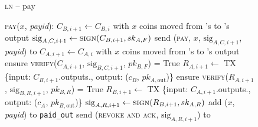 \begin{figure}[H]
  \begin{processbox}{\textsc{ln} -- pay}
    \begin{algorithmic}[1]
      \State \textsc{pay}($x$, \textit{payid}): 
      \Indent
        \State $C_{B, i+1} \gets C_{B, i}$ with $x$ coins moved from \alice's to
        \bob's output
        \State $\mathrm{sig}_{A, C, i+1} \gets \textsc{sign}(C_{B, i+1}, sk_{A,
        F})$ 
        \State send (\textsc{pay}, $x$, $\mathrm{sig}_{A, C, i+1}$,
        \textit{payid}) to \bob
        \State {}
        \State {}
        \State {}
        \State {} 
        \State {}
        \State {}
        \State {}
        \State $C_{A, i+1} \gets C_{A, i}$ with $x$ coins moved from \alice's to
        \bob's output
        \State ensure \textsc{verify}($C_{A, i+1}$, $\mathrm{sig}_{B, C, i+1}$,
        $pk_{B, F}$) = True
        \State $R_{A, i+1} \gets$ TX \{input: $C_{B, i+1}$.outputs.\alice,
        output: ($c_B$, $pk_{A, \mathrm{out}}$)\}
        \State ensure \textsc{verify}($R_{A, i+1}$, $\mathrm{sig}_{B, R, i+1}$,
        $pk_{B, R}$) = True
        \State $R_{B, i+1} \gets$ TX \{input: $C_{A, i+1}$.outputs.\bob,
        output: ($c_A$, $pk_{B, \mathrm{out}}$)\}
        \State $\mathrm{sig}_{A, R, i+1} \gets \textsc{sign}(R_{B, i+1}, sk_{A,
        R})$
        \State add ($x$, \textit{payid}) to \texttt{paid\_out}
        \State send (\textsc{revoke and ack}, $\mathrm{sig}_{A, R, i+1}$) to
        \bob
        \State {}
        \State {}
        \State {}
      \EndIndent
    \end{algorithmic}
  \end{processbox}
  \caption{}
  \label{code:ln:pay}
\end{figure}

